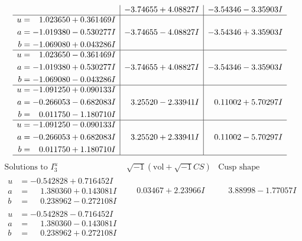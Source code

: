 \documentclass[1p]{elsarticle_modified}
\theoremstyle{definition}
\newcommand{\I}{\sqrt{-1}}
\begin{document}
$$\begin{array}{c|c|c}
 & -3.74655 + 4.08827 I & -3.54346 - 3.35903 I \\ \hline\begin{aligned}
u &= \phantom{-}1.023650 + 0.361469 I \\
a &= -1.019380 - 0.530277 I \\
b &= -1.069080 + 0.043286 I\end{aligned}
 & -3.74655 - 4.08827 I & -3.54346 + 3.35903 I \\ \hline\begin{aligned}
u &= \phantom{-}1.023650 - 0.361469 I \\
a &= -1.019380 + 0.530277 I \\
b &= -1.069080 - 0.043286 I\end{aligned}
 & -3.74655 + 4.08827 I & -3.54346 - 3.35903 I \\ \hline\begin{aligned}
u &= -1.091250 + 0.090133 I \\
a &= -0.266053 - 0.682083 I \\
b &= \phantom{-}0.011750 - 1.180710 I\end{aligned}
 & \phantom{-}3.25520 - 2.33941 I & \phantom{-}0.11002 + 5.70297 I \\ \hline\begin{aligned}
u &= -1.091250 - 0.090133 I \\
a &= -0.266053 + 0.682083 I \\
b &= \phantom{-}0.011750 + 1.180710 I\end{aligned}
 & \phantom{-}3.25520 + 2.33941 I & \phantom{-}0.11002 - 5.70297 I\\
 \hline 
 \end{array}$$\newpage$$\begin{array}{c|c|c}  
\text{Solutions to }I^u_{3}& \I (\text{vol} + \sqrt{-1}CS) & \text{Cusp shape}\\
 \hline 
\begin{aligned}
u &= -0.542828 + 0.716452 I \\
a &= \phantom{-}1.380360 + 0.143081 I \\
b &= \phantom{-}0.238962 - 0.272108 I\end{aligned}
 & \phantom{-}0.03467 + 2.23966 I & \phantom{-}3.88998 - 1.77057 I \\ \hline\begin{aligned}
u &= -0.542828 - 0.716452 I \\
a &= \phantom{-}1.380360 - 0.143081 I \\
b &= \phantom{-}0.238962 + 0.272108 I\end{aligned}

\end{array}$$
\end{document}
